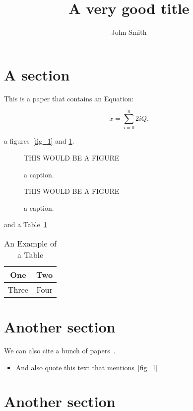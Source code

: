 \documentclass[crop=false]{standalone}
\begin{document}
\title{A very good title}
\author{John Smith}
\date{}
\maketitle
\footnotesize
\section{A section}\label{section}
This is a paper that contains an Equation:

\begin{equation}
\label{eq1}
x = \sum_{i=0}^{n} 2{i} Q.
\end{equation}

a figures~\ref{fig_1} and \ref{fig_2}.

\begin{figure}[!t]
  \begin{minipage}{.49\linewidth}
\centering
THIS WOULD BE A FIGURE
\caption{a caption.}
\label{fig_1}
\end{minipage}%
 \begin{minipage}{.49\linewidth}
\centering
THIS WOULD BE A FIGURE
\caption{a caption.}
\label{fig_2}
\end{minipage}
\end{figure}

and a Table~\ref{table1}
\begin{table}[!t]
\caption{An Example of a Table\label{table1}}
\centering
\begin{tabular}{|c||c|}
\hline
One & Two\\
\hline
Three & Four\\
\hline
\end{tabular}
\end{table}

\section{Another section}

We can also cite a bunch of papers~\cite{LopBlu2010cor,BluBleLop09-BeamSearch-LCS,LopPraPae08aco}.

  \begin{itemize}
  \item And also quote this text that mentions~\ref{fig_1} 
  \end{itemize}

\section{Another section}




\tiny


\end{document}
